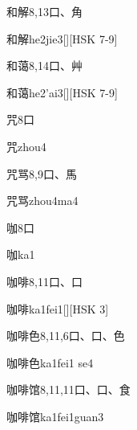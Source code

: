 \begin{Entry}{和解}{8,13}{⼝、⾓}
  \begin{Phonetics}{和解}{he2jie3}[][HSK 7-9]
  \end{Phonetics}
\end{Entry}

\begin{Entry}{和蔼}{8,14}{⼝、⾋}
  \begin{Phonetics}{和蔼}{he2'ai3}[][HSK 7-9]
  \end{Phonetics}
\end{Entry}

\begin{Entry}{咒}{8}{⼝}
  \begin{Phonetics}{咒}{zhou4}
  \end{Phonetics}
\end{Entry}

\begin{Entry}{咒骂}{8,9}{⼝、⾺}
  \begin{Phonetics}{咒骂}{zhou4ma4}
  \end{Phonetics}
\end{Entry}

\begin{Entry}{咖}{8}{⼝}
  \begin{Phonetics}{咖}{ka1}
  \end{Phonetics}
\end{Entry}

\begin{Entry}{咖啡}{8,11}{⼝、⼝}
  \begin{Phonetics}{咖啡}{ka1fei1}[][HSK 3]
  \end{Phonetics}
\end{Entry}

\begin{Entry}{咖啡色}{8,11,6}{⼝、⼝、⾊}
  \begin{Phonetics}{咖啡色}{ka1fei1 se4}
  \end{Phonetics}
\end{Entry}

\begin{Entry}{咖啡馆}{8,11,11}{⼝、⼝、⾷}
  \begin{Phonetics}{咖啡馆}{ka1fei1guan3}
  \end{Phonetics}
\end{Entry}

